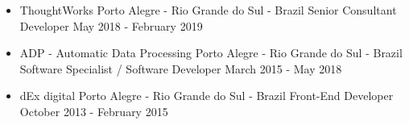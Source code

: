 \documentclass[a4,11pt]{article}
\begin{document}
\begin{itemize}
\begin{itemize}
            \end{itemize}
        \item
            \ressubheading
                {ThoughtWorks}
                {Porto Alegre - Rio Grande do Sul - Brazil}
                {Senior Consultant Developer}
                {May 2018 - February 2019}
        \item
            \ressubheading
                {ADP - Automatic Data Processing}
                {Porto Alegre - Rio Grande do Sul - Brazil}
                {Software Specialist / Software Developer}
                {March 2015 - May 2018}
        \item
            \ressubheading
                {dEx digital}
                {Porto Alegre - Rio Grande do Sul - Brazil}
                {Front-End Developer}
                {October 2013 - February 2015}


\end{itemize}
\end{document}
